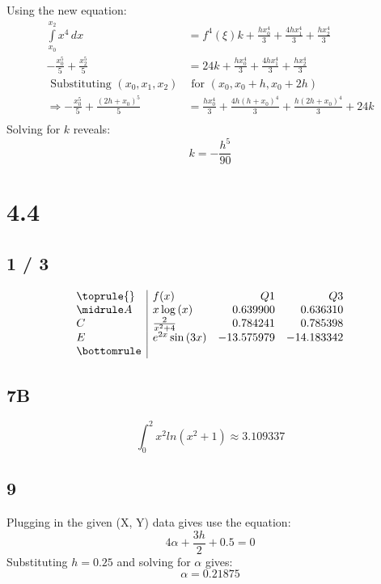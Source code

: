\documentclass{oisinclass}
\begin{document}
Using the new equation:
\begin{align*}
	\int\limits_{x_{0}}^{x_{2}} x^{4}\,dx                                      & =  f^4(\xi) k + \frac{h x_{0}^{4}}{3} + \frac{4 h x_{1}^{4}}{3} + \frac{h x_{2}^{4}}{3}                              \\
	- \frac{x_{0}^{5}}{5} + \frac{x_{2}^{5}}{5}                                & =          24 k + \frac{h x_{0}^{4}}{3} + \frac{4 h x_{1}^{4}}{3} + \frac{h x_{2}^{4}}{3}                            \\
	\text{ Substituting } (x_0, x_1, x_2)                                      & \text{ for } (x_0, x_0 + h, x_0 + 2h)                                                                                \\
	\Rightarrow - \frac{x_{0}^{5}}{5} + \frac{\left(2 h + x_{0}\right)^{5}}{5} & = \frac{h x_{0}^{4}}{3} + \frac{4 h \left(h + x_{0}\right)^{4}}{3} + \frac{h \left(2 h + x_{0}\right)^{4}}{3} + 24 k \\
\end{align*}
Solving for \(k\) reveals:
\[
	k = -\frac{h^5}{90}
\]

\section*{4.4}
\subsection*{1 / 3}
\[
	\begin{array}{l|lrr}
		\toprule
		{} & f(x)                            & Q1         & Q3         \\
		\midrule
		A  & x \log{\left(x \right)}         & 0.639900   & 0.636310   \\
		C  & \frac{2}{x^{2} + 4}             & 0.784241   & 0.785398   \\
		E  & e^{2 x} \sin{\left(3 x \right)} & -13.575979 & -14.183342 \\
		\bottomrule
	\end{array}
\]
\subsection*{7B}
\[
	\int_{0}^{2}x^2ln(x^2 + 1) \approx 3.109337
\]

\subsection*{9}
Plugging in the given (X, Y) data gives use the equation:
\[
	4 \alpha + \frac{3 h}{2} + 0.5 = 0
\]
Substituting \(h = 0.25\) and solving for \(\alpha\) gives:
\[
	\alpha = 0.21875
\]
\end{document}
